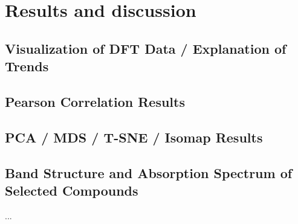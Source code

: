 \documentclass[twoside,twocolumn,9pt]{article}
\begin{document}
\newpage




\section*{Results and discussion}

\subsection*{Visualization of DFT Data / Explanation of Trends}

\subsection*{Pearson Correlation Results}

\subsection*{PCA / MDS / T-SNE / Isomap Results}

\subsection*{Band Structure and Absorption Spectrum of Selected Compounds}

... \\
\end{document}
